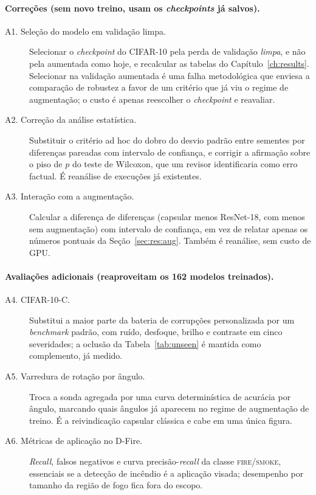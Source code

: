 \paragraph{Correções (sem novo treino, usam os \emph{checkpoints} já salvos).}
\begin{description}
  \item[A1. Seleção do modelo em validação limpa.] Selecionar o
  \emph{checkpoint} do CIFAR-10 pela perda de validação \emph{limpa}, e não pela
  aumentada como hoje, e recalcular as tabelas do Capítulo~\ref{ch:results}.
  Selecionar na validação aumentada é uma falha metodológica que enviesa a
  comparação de robustez a favor de um critério que já viu o regime de
  augmentação; o custo é apenas reescolher o \emph{checkpoint} e reavaliar.
  \item[A2. Correção da análise estatística.] Substituir o critério ad hoc do
  dobro do desvio padrão entre sementes por diferenças pareadas com intervalo de
  confiança, e corrigir a afirmação sobre o piso de $p$ do teste de Wilcoxon, que
  um revisor identificaria como erro factual. É reanálise de execuções já
  existentes.
  \item[A3. Interação com a augmentação.] Calcular a diferença de diferenças
  (capsular menos ResNet-18, com menos sem augmentação) com intervalo de
  confiança, em vez de relatar apenas os números pontuais da
  Seção~\ref{sec:res:aug}. Também é reanálise, sem custo de GPU.
\end{description}

\paragraph{Avaliações adicionais (reaproveitam os 162 modelos treinados).}
\begin{description}
  \item[A4. CIFAR-10-C.] Substitui a maior parte da bateria de corrupções
  personalizada por um \emph{benchmark} padrão, com ruído, desfoque, brilho e
  contraste em cinco severidades; a oclusão da Tabela~\ref{tab:unseen} é mantida
  como complemento, já medido.
  \item[A5. Varredura de rotação por ângulo.] Troca a sonda agregada por uma
  curva determinística de acurácia por ângulo, marcando quais ângulos já
  aparecem no regime de augmentação de treino. É a reivindicação capsular
  clássica e cabe em uma única figura.
  \item[A6. Métricas de aplicação no D-Fire.] \emph{Recall}, falsos negativos e
  curva precisão-\emph{recall} da classe \textsc{fire/smoke}, essenciais se a
  detecção de incêndio é a aplicação visada; desempenho por tamanho da região de
  fogo fica fora do escopo.
\end{description}

